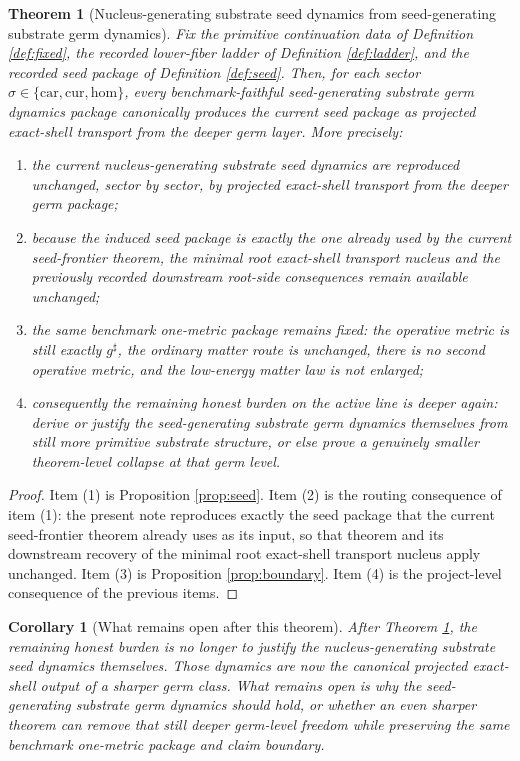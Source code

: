 \documentclass[11pt]{article}
\newcommand{\CompletedMetric}{g^{\sharp}}
\newcommand{\Car}{\mathrm{car}}
\newcommand{\Cur}{\mathrm{cur}}
\newcommand{\Hom}{\mathrm{hom}}
\newtheorem{corollary}{Corollary}
\newtheorem{theorem}{Theorem}
\begin{document}
\begin{theorem}[Nucleus-generating substrate seed dynamics from seed-generating substrate germ dynamics]
\label{thm:main}
Fix the primitive continuation data of Definition \ref{def:fixed}, the recorded lower-fiber ladder of Definition \ref{def:ladder}, and the recorded seed package of Definition \ref{def:seed}. Then, for each sector \(\sigma\in\{\Car,\Cur,\Hom\}\), every benchmark-faithful seed-generating substrate germ dynamics package canonically produces the current seed package as projected exact-shell transport from the deeper germ layer. More precisely:
\begin{enumerate}
    \item the current nucleus-generating substrate seed dynamics are reproduced unchanged, sector by sector, by projected exact-shell transport from the deeper germ package;
    \item because the induced seed package is exactly the one already used by the current seed-frontier theorem, the minimal root exact-shell transport nucleus and the previously recorded downstream root-side consequences remain available unchanged;
    \item the same benchmark one-metric package remains fixed: the operative metric is still exactly \(\CompletedMetric\), the ordinary matter route is unchanged, there is no second operative metric, and the low-energy matter law is not enlarged;
    \item consequently the remaining honest burden on the active line is deeper again: derive or justify the seed-generating substrate germ dynamics themselves from still more primitive substrate structure, or else prove a genuinely smaller theorem-level collapse at that germ level.
\end{enumerate}
\end{theorem}

\begin{proof}
Item (1) is Proposition \ref{prop:seed}. Item (2) is the routing consequence of item (1): the present note reproduces exactly the seed package that the current seed-frontier theorem already uses as its input, so that theorem and its downstream recovery of the minimal root exact-shell transport nucleus apply unchanged. Item (3) is Proposition \ref{prop:boundary}. Item (4) is the project-level consequence of the previous items.
\end{proof}

\begin{corollary}[What remains open after this theorem]
\label{cor:next}
After Theorem \ref{thm:main}, the remaining honest burden is no longer to justify the nucleus-generating substrate seed dynamics themselves. Those dynamics are now the canonical projected exact-shell output of a sharper germ class. What remains open is why the seed-generating substrate germ dynamics should hold, or whether an even sharper theorem can remove that still deeper germ-level freedom while preserving the same benchmark one-metric package and claim boundary.
\end{corollary}
\end{document}
